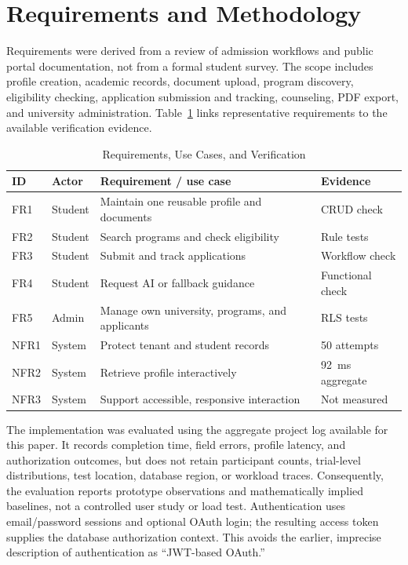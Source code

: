 \documentclass[conference,letterpaper]{IEEEtran}
\begin{document}
\section{Requirements and Methodology}
Requirements were derived from a review of admission workflows and public portal documentation, not from a formal student survey. The scope includes profile creation, academic records, document upload, program discovery, eligibility checking, application submission and tracking, counseling, PDF export, and university administration. Table~\ref{tab:req} links representative requirements to the available verification evidence.

\begin{table}[!t]
\caption{Requirements, Use Cases, and Verification}
\label{tab:req}
\centering\scriptsize
\setlength{\tabcolsep}{2.1pt}\renewcommand{\arraystretch}{1.08}
\begin{tabularx}{\columnwidth}{@{}l l X l@{}}
\toprule
ID & Actor & Requirement / use case & Evidence\\
\midrule
FR1 & Student & Maintain one reusable profile and documents & CRUD check\\
FR2 & Student & Search programs and check eligibility & Rule tests\\
FR3 & Student & Submit and track applications & Workflow check\\
FR4 & Student & Request AI or fallback guidance & Functional check\\
FR5 & Admin & Manage own university, programs, and applicants & RLS tests\\
NFR1 & System & Protect tenant and student records & 50 attempts\\
NFR2 & System & Retrieve profile interactively & 92~ms aggregate\\
NFR3 & System & Support accessible, responsive interaction & Not measured\\
\bottomrule
\end{tabularx}
\end{table}

The implementation was evaluated using the aggregate project log available for this paper. It records completion time, field errors, profile latency, and authorization outcomes, but does not retain participant counts, trial-level distributions, test location, database region, or workload traces. Consequently, the evaluation reports prototype observations and mathematically implied baselines, not a controlled user study or load test. Authentication uses email/password sessions and optional OAuth login; the resulting access token supplies the database authorization context. This avoids the earlier, imprecise description of authentication as “JWT-based OAuth.”
\end{document}
